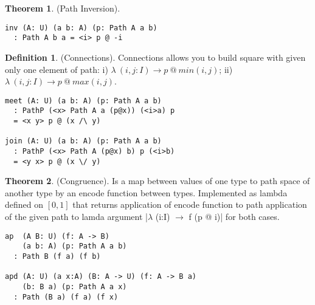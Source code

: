 \documentclass{article}
\theoremstyle{definition}
\newtheorem{theorem}{Theorem}
\newtheorem{definition}{Definition}
\begin{document}
\begin{theorem} (Path Inversion).
\begin{lstlisting}
inv (A: U) (a b: A) (p: Path A a b)
  : Path A b a = <i> p @ -i
\end{lstlisting}
\end{theorem}

\begin{definition} (Connections).
Connections allows you to build square
with given only one element of path: i) $\lambda\ (i,j: I) \rightarrow p\ @\ min(i,j)$;
ii) $\lambda\ (i,j:I) \rightarrow p\ @\ max(i,j)$.
\begin{center}
\end{center}
\begin{lstlisting}
meet (A: U) (a b: A) (p: Path A a b)
  : PathP (<x> Path A a (p@x)) (<i>a) p
  = <x y> p @ (x /\ y)

join (A: U) (a b: A) (p: Path A a b)
  : PathP (<x> Path A (p@x) b) p (<i>b)
  = <y x> p @ (x \/ y)
\end{lstlisting}
\end{definition}

\begin{theorem} (Congruence).
Is a map between values of one type
to path space of another type by an encode function between types.
Implemented as lambda defined on $[0,1]$ that returns
application of encode function to path application of
the given path to lamda argument |$\lambda$ (i:I) $\rightarrow$ f (p @ i)|
for both cases.
\begin{lstlisting}
ap  (A B: U) (f: A -> B)
    (a b: A) (p: Path A a b)
  : Path B (f a) (f b)

apd (A: U) (a x:A) (B: A -> U) (f: A -> B a)
    (b: B a) (p: Path A a x)
  : Path (B a) (f a) (f x)
\end{lstlisting}
\end{theorem}
\end{document}
